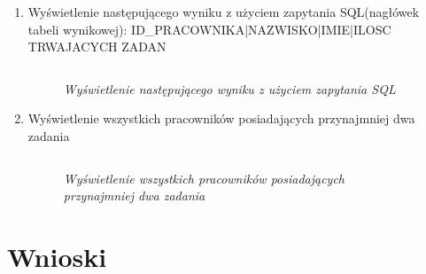\documentclass{article}
\begin{document}
\begin{enumerate}
\item Wyświetlenie następującego wyniku z użyciem zapytania SQL(nagłówek tabeli wynikowej): ID\_PRACOWNIKA|NAZWISKO|IMIE|ILOSC TRWAJACYCH ZADAN

\begin{lstlisting}[style=SQL, caption=\textit{Wyświetlenie następującego wyniku z użyciem zapytania SQL}]
\end{lstlisting}

\begin{figure}[H]
	\centering
	\caption{\textit{Wyświetlenie następującego wyniku z użyciem zapytania SQL}}
\end{figure}

\item Wyświetlenie wszystkich pracowników posiadających przynajmniej dwa zadania

\begin{lstlisting}[style=SQL, caption=\textit{Wyświetlenie wszystkich pracowników posiadających przynajmniej dwa zadania}]
\end{lstlisting}

\begin{figure}[H]
	\centering
	\caption{\textit{Wyświetlenie wszystkich pracowników posiadających przynajmniej dwa zadania}}
\end{figure}


\end{enumerate}
\section{Wnioski}
\end{document}
